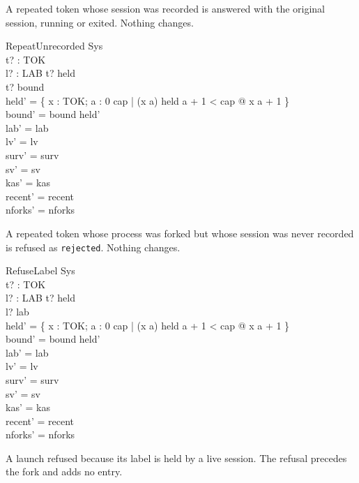 \documentclass[a4paper,10pt,fleqn]{article}
\begin{document}
A repeated token whose session was recorded is answered with the original session, running or exited. Nothing changes.

\begin{schema}{RepeatUnrecorded}
  \Delta Sys \\
  t? : TOK \\ l? : LAB
\where
  t? \in \dom held \\
  t? \notin bound \\
  held' = \{ x : TOK; a : 0 \upto cap | (x \mapsto a) \in held \land a + 1 < cap @ x \mapsto a + 1 \} \\
  bound' = bound \cap \dom held' \\
  lab' = lab \\
  lv' = lv \\
  surv' = surv \\
  sv' = sv \\
  kas' = kas \\
  recent' = recent \\
  nforks' = nforks
\end{schema}

A repeated token whose process was forked but whose session was never recorded is refused as \texttt{rejected}. Nothing changes.

\begin{schema}{RefuseLabel}
  \Delta Sys \\
  t? : TOK \\ l? : LAB
\where
  t? \notin \dom held \\
  l? \in \dom lab \\
  held' = \{ x : TOK; a : 0 \upto cap | (x \mapsto a) \in held \land a + 1 < cap @ x \mapsto a + 1 \} \\
  bound' = bound \cap \dom held' \\
  lab' = lab \\
  lv' = lv \\
  surv' = surv \\
  sv' = sv \\
  kas' = kas \\
  recent' = recent \\
  nforks' = nforks
\end{schema}

A launch refused because its label is held by a live session. The refusal precedes the fork and adds no entry.
\end{document}
